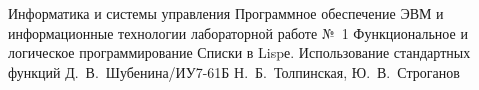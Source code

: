 \documentclass{bmstu}
\begin{document}
	\makereporttitle
	{Информатика и системы управления} %
	{Программное обеспечение ЭВМ и информационные технологии} %
	{лабораторной работе №~1} %
	{Функциональное и логическое программирование} %
	{Списки в Lispе. Использование стандартных функций} %
	{} %
	{Д.~В.~Шубенина/ИУ7-61Б} %
	{Н.~Б.~Толпинская, Ю.~В.~Строганов} %
	\maketableofcontents
	
	
\end{document}
